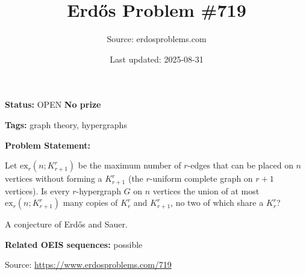 \documentclass{article}
\title{Erd\H{o}s Problem \#719}
\date{Last updated: 2025-08-31}
\author{Source: erdosproblems.com}
\begin{document}
\maketitle

\noindent\textbf{Status:} OPEN \quad \textbf{No prize}

\noindent\textbf{Tags:} graph theory, hypergraphs

\medskip

\noindent\textbf{Problem Statement:}

Let $\mathrm{ex}_r(n;K_{r+1}^r)$ be the maximum number of $r$-edges that can be placed on $n$ vertices without forming a $K_{r+1}^r$ (the $r$-uniform complete graph on $r+1$ vertices). Is every $r$-hypergraph $G$ on $n$ vertices the union of at most $\mathrm{ex}_{r}(n;K_{r+1}^r)$ many copies of $K_r^r$ and $K_{r+1}^r$, no two of which share a $K_r^r$?




A conjecture of Erd\H{o}s and Sauer.

\noindent\textbf{Related OEIS sequences:} possible


\bigskip
\noindent\small{Source: \url{https://www.erdosproblems.com/719}}
\end{document}
